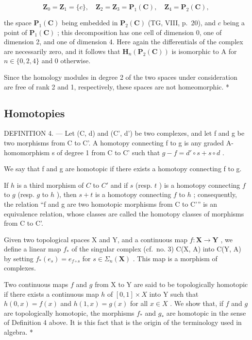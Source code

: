 \[
\mathbf {Z} _ {0} = \mathbf {Z} _ {1} = \{c \}, \quad \mathbf {Z} _ {2} = \mathbf {Z} _ {3} = \mathbf {P} _ {1} (\mathbf {C}), \quad \mathbf {Z} _ {4} = \mathbf {P} _ {2} (\mathbf {C}),
\]

the space \(\mathbf{P}_{1}(\mathbf{C})\) being embedded in \(\mathbf{P}_{2}(\mathbf{C})\) (TG, VIII, p.~20), and \(c\) being a point of \(\mathbf{P}_{1}(\mathbf{C})\) ; this decomposition has one cell of dimension 0, one of dimension 2, and one of dimension 4. Here again the differentials of the complex are necessarily zero, and it follows that \(\mathbf{H}_{n}(\mathbf{P}_{2}(\mathbf{C}))\) is isomorphic to A for \(n \in \{0, 2, 4\}\) and 0 otherwise.

Since the homology modules in degree 2 of the two spaces under consideration are free of rank 2 and 1, respectively, these spaces are not homeomorphic. *

\subsection{Homotopies}

DEFINITION 4. --- Let (C, d) and (C', d') be two complexes, and let f and g be two morphisms from C to C'. A homotopy connecting f to g is any graded A-homomorphism s of degree 1 from C to C' such that \(g - f = d' \circ s + s \circ d\) .

We say that f and g are homotopic if there exists a homotopy connecting f to g.

If \(h\) is a third morphism of \(C\) to \(C'\) and if \(s\) (resp. \(t\) ) is a homotopy connecting \(f\) to \(g\) (resp. \(g\) to \(h\) ), then \(s + t\) is a homotopy connecting \(f\) to \(h\) ; consequently, the relation “f and g are two homotopic morphisms from C to C'” is an equivalence relation, whose classes are called the homotopy classes of morphisms from C to C'.

Given two topological spaces X and Y, and a continuous map \(f: \mathbf{X} \to \mathbf{Y}\) , we define a linear map \(f_{*}\) of the singular complex (cf.~no. 3) C(X, A) into C(Y, A) by setting \(f_{*}(e_{s}) = e_{f \circ s}\) for \(s \in \Sigma_{n}(\mathbf{X})\) . This map is a morphism of complexes.

Two continuous maps \(f\) and \(g\) from X to Y are said to be topologically homotopic if there exists a continuous map \(h\) of \([0, 1] \times X\) into Y such that \(h(0, x) = f(x)\) and \(h(1, x) = g(x)\) for all \(x \in X\) . We show that, if \(f\) and \(g\) are topologically homotopic, the morphisms \(f_*\) and \(g_*\) are homotopic in the sense of Definition 4 above. It is this fact that is the origin of the terminology used in algebra. *

